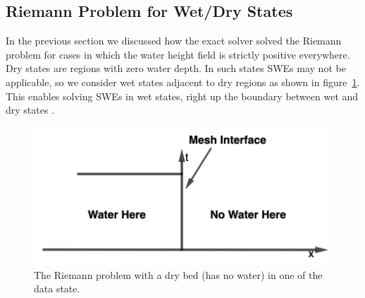 \documentclass[10pt,a4paper]{article}
\begin{document}
	
	\subsection{Riemann Problem for Wet/Dry States}
	
	In the previous section we discussed how the exact solver solved the Riemann problem for cases in which the water height field is strictly positive everywhere. Dry states are regions with zero water depth. In such states SWEs may not be applicable, so we consider wet states adjacent to dry regions as shown in figure~\ref{fig:dry-bed}. This enables solving SWEs in wet states, right up the boundary between wet and dry states  \citep{toro2001shock,ge:2008}.
	\begin{figure}[H]
		\centering
		\includegraphics[width=0.5\linewidth]{images/dd1}
		\caption{ The Riemann problem with a dry bed (has no water) in one of the data state. }
		\label{fig:dry-bed}
	\end{figure}
	
\end{document}
